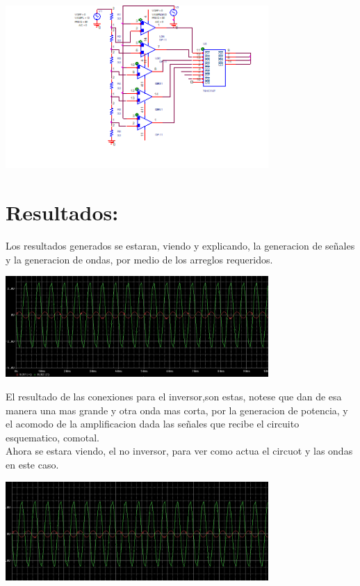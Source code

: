 \documentclass[12pt,a4paper]{article}
\begin{document}
\begin{center}
\includegraphics[width=10cm]{Simulaciones/ADC.png} 
\end{center}

\section{Resultados:}

Los resultados generados se estaran, viendo y explicando, la generacion de señales y la generacion de ondas, por medio de los arreglos requeridos.

\begin{center}
\includegraphics[width=10cm]{Simulaciones/inverso.png} 
\end{center}

El resultado de las conexiones para el inversor,son estas, notese que dan de esa manera una mas grande y otra onda mas corta, por la generacion de potencia, y el acomodo de la amplificacion dada las señales que recibe el circuito esquematico, comotal.\\
Ahora se estara viendo, el no inversor, para ver como actua el circuot y las ondas en este caso.

\begin{center}
\includegraphics[width=10cm]{Simulaciones/noinvers.png} 
\end{center}
\end{document}
